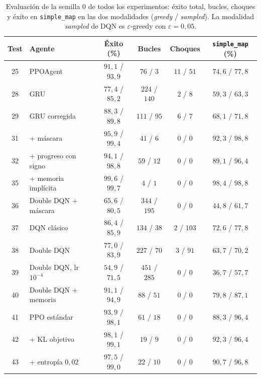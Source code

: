 \begin{table}[htbp]
    \centering
    \caption[Evaluación de la semilla 0 de todos los experimentos]{Evaluación
    de la semilla $0$ de todos los experimentos: éxito total, bucles,
    choques y éxito en \texttt{simple\_map} en las dos modalidades
    (\textit{greedy} / \textit{sampled}). La modalidad \textit{sampled} de
    DQN es $\varepsilon$-greedy con $\varepsilon = 0{,}05$.}
    \label{tab:global_semilla0}
    \small
    \begin{tabular}{clcccc}
        \toprule
        \textbf{Test} & \textbf{Agente} & \textbf{Éxito (\%)} & \textbf{Bucles} & \textbf{Choques} & \textbf{\texttt{simple\_map} (\%)} \\
        \midrule
        25 & PPOAgent & $91{,}1$ / $93{,}9$ & $76$ / $3$ & $11$ / $51$ & $74{,}6$ / $77{,}8$ \\
        28 & GRU & $77{,}4$ / $85{,}2$ & $224$ / $140$ & $2$ / $8$ & $59{,}3$ / $63{,}3$ \\
        29 & GRU corregida & $88{,}3$ / $89{,}8$ & $111$ / $95$ & $6$ / $7$ & $68{,}1$ / $71{,}8$ \\
        31 & + máscara & $95{,}9$ / $99{,}4$ & $41$ / $6$ & $0$ / $0$ & $92{,}3$ / $98{,}8$ \\
        32 & + progreso con signo & $94{,}1$ / $98{,}8$ & $59$ / $12$ & $0$ / $0$ & $89{,}1$ / $96{,}4$ \\
        35 & + memoria implícita & $99{,}6$ / $99{,}7$ & $4$ / $1$ & $0$ / $0$ & $98{,}4$ / $98{,}8$ \\
        \midrule
        36 & Double DQN + máscara & $65{,}6$ / $80{,}5$ & $344$ / $195$ & $0$ / $0$ & $44{,}8$ / $61{,}7$ \\
        37 & DQN clásico & $86{,}4$ / $85{,}9$ & $134$ / $38$ & $2$ / $103$ & $72{,}6$ / $77{,}8$ \\
        38 & Double DQN & $77{,}0$ / $83{,}9$ & $227$ / $70$ & $3$ / $91$ & $63{,}7$ / $70{,}2$ \\
        39 & Double DQN, lr $10^{-4}$ & $54{,}9$ / $71{,}5$ & $451$ / $285$ & $0$ / $0$ & $36{,}7$ / $57{,}7$ \\
        40 & Double DQN + memoria & $91{,}1$ / $94{,}9$ & $88$ / $51$ & $0$ / $0$ & $79{,}8$ / $87{,}1$ \\
        \midrule
        41 & PPO estándar & $93{,}9$ / $98{,}1$ & $61$ / $18$ & $0$ / $0$ & $88{,}3$ / $96{,}4$ \\
        42 & + KL objetivo & $98{,}1$ / $99{,}1$ & $19$ / $9$ & $0$ / $0$ & $92{,}3$ / $96{,}4$ \\
        43 & + entropía $0{,}02$ & $97{,}5$ / $99{,}0$ & $22$ / $10$ & $0$ / $0$ & $90{,}7$ / $96{,}8$ \\
        \bottomrule
    \end{tabular}
\end{table}

